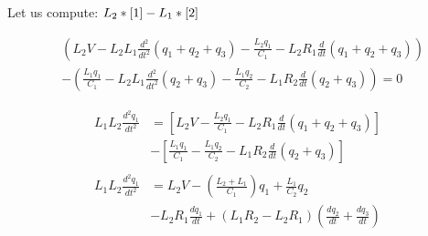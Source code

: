 \documentclass[10pt,a4paper]{article}
\begin{document}
Let us compute: $L_2*\eqref{1} - L_1*\eqref{2}$

\begin{align*}
	&\left( L_2 V-L_2 L_1 \frac{d^2}{dt^2}(q_1+q_2+q_3)-\frac{L_2 q_1}{C_1}-L_2 R_1\frac{d}{dt}(q_1+q_2+q_3)\right)\\ 
	&-\left( \frac{L_1 q_1}{C_1} -L_2 L_1 \frac{d^2}{dt^2}(q_2+q_3)-\frac{L_1 q_2}{C_2} -L_1 R_2 \frac{d}{dt}(q_2+q_3)\right)=0
\end{align*}

\begin{align*}
	L_1 L_2 \frac{d^2 q_1}{dt^2}&=\left[ L_2 V -\frac{L_2 q_1}{C_1}-L_2 R_1 \frac{d}{dt}(q_1+q_2+q_3)\right]\\
	&-\left[\frac{L_1 q_1}{C_1}-\frac{L_1 q_2}{C_2}-L_1 R_2 \frac{d}{dt}(q_2+q_3)\right]\\
	\\    
	L_1 L_2 \frac{d^2 q_1}{dt^2}&=L_2 V -\left(\frac{L_2+L_1}{C_1}\right)q_1+\frac{L_1}{C_2}q_2\\
	&-L_2 R_1\frac{dq_1}{dt}+(L_1 R_2-L_2 R_1)\left(\frac{dq_2}{dt}+\frac{dq_3}{dt}\right)
\end{align*}
\end{document}
